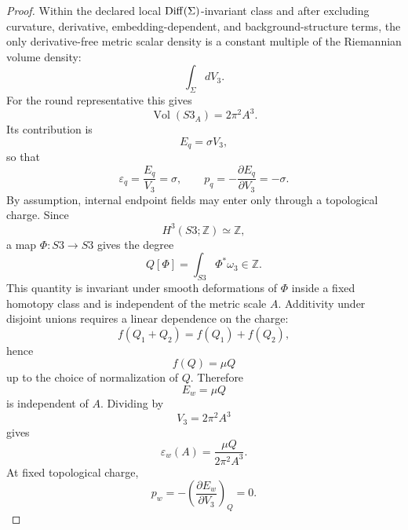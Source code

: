\documentclass[11pt,a4paper]{article}
\def\Sthree{S3}%
\def\dd{d}%
\numberwithin{equation}{section}
\theoremstyle{remark}
\newcommand{\Sthree}{S^3}
\newcommand{\dd}{\mathrm{d}}
\begin{document}
\begin{proof}
Within the declared local \({\rm Diff}(\Sigma)\)-invariant class and after excluding curvature, derivative, embedding-dependent, and background-structure terms, the only derivative-free metric scalar density is a constant multiple of the Riemannian volume density:
\begin{equation}
\int_{\Sigma}\dd V_3 .
\end{equation}
For the round representative this gives
\begin{equation}
\operatorname{Vol}(\Sthree_A)=2\pi^2A^3 .
\end{equation}
Its contribution is
\begin{equation}
E_q=\sigma V_3,
\end{equation}
so that
\begin{equation}
\varepsilon_q=\frac{E_q}{V_3}=\sigma,
\qquad
p_q=-\frac{\partial E_q}{\partial V_3}=-\sigma .
\end{equation}
By assumption, internal endpoint fields may enter only through a topological charge. Since
\begin{equation}
H^3(\Sthree;\mathbb{Z})\simeq\mathbb{Z},
\end{equation}
a map \(\Phi:\Sthree\to\Sthree\) gives the degree
\begin{equation}
Q[\Phi]=\int_{\Sthree}\Phi^*\omega_3\in\mathbb{Z}.
\end{equation}
This quantity is invariant under smooth deformations of \(\Phi\) inside a fixed homotopy class and is independent of the metric scale \(A\). Additivity under disjoint unions requires a linear dependence on the charge:
\begin{equation}
f(Q_1+Q_2)=f(Q_1)+f(Q_2),
\end{equation}
hence
\begin{equation}
f(Q)=\mu Q
\end{equation}
up to the choice of normalization of \(Q\). Therefore
\begin{equation}
E_w=\mu Q
\end{equation}
is independent of \(A\). Dividing by
\begin{equation}
V_3=2\pi^2A^3
\end{equation}
gives
\begin{equation}
\varepsilon_w(A)=\frac{\mu Q}{2\pi^2A^3}.
\end{equation}
At fixed topological charge,
\begin{equation}
p_w=-\left(\frac{\partial E_w}{\partial V_3}\right)_Q=0.
\end{equation}

\end{proof}
\end{document}
